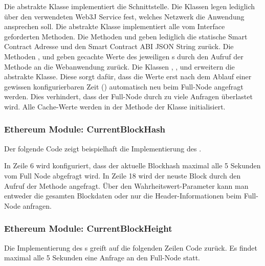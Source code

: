 Die abstrakte Klasse  implementiert die   Schnittstelle. Die Klassen  legen lediglich über den verwendeten Web3J Service fest, welches Netzwerk die Anwendung ansprechen soll.
Die abstrakte Klasse  implementiert alle vom  Interface geforderten Methoden. Die Methoden  und  geben lediglich die statische Smart Contract Adresse und den Smart Contract ABI JSON String zurück. Die Methoden ,  und  geben gecachte Werte des jeweiligen s durch den Aufruf der  Methode an die Webanwendung zurück. Die Klassen ,  ,  und  erweitern die abstrakte  Klasse. Diese sorgt dafür, dass die Werte erst nach dem Ablauf einer gewissen konfigurierbaren Zeit () automatisch neu beim Full-Node angefragt werden. Dies verhindert, dass der Full-Node durch zu viele Anfragen überlastet wird. Alle Cache-Werte werden in der  Methode der  Klasse initialisiert. 


\subsubsection{Ethereum Module: CurrentBlockHash}

Der folgende Code zeigt beispielhaft die Implementierung des .



In Zeile 6 wird konfiguriert, dass der aktuelle Blockhash maximal alle 5 Sekunden vom Full Node abgefragt wird. In Zeile 18 wird der neuste Block durch den Aufruf der  Methode angefragt. Über den Wahrheitswert-Parameter kann man entweder die gesamten Blockdaten oder nur die Header-Informationen beim Full-Node anfragen.

\subsubsection{Ethereum Module: CurrentBlockHeight}
Die Implementierung des s greift auf die folgenden Zeilen Code zurück. Es findet maximal alle 5 Sekunden eine Anfrage an den Full-Node statt.

